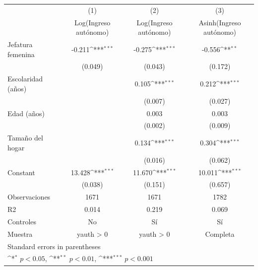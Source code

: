 {
\def\sym#1{\ifmmode^{#1}\else\(^{#1}\)\fi}
\begin{tabular}{l*{3}{c}}
\hline\hline
                    &\multicolumn{1}{c}{(1)}&\multicolumn{1}{c}{(2)}&\multicolumn{1}{c}{(3)}\\
                    &\multicolumn{1}{c}{Log(Ingreso autónomo)}&\multicolumn{1}{c}{Log(Ingreso autónomo)}&\multicolumn{1}{c}{Asinh(Ingreso autónomo)}\\
\hline
Jefatura femenina   &      -0.211\sym{***}&      -0.275\sym{***}&      -0.556\sym{**} \\
                    &     (0.049)         &     (0.043)         &     (0.172)         \\
[1em]
Escolaridad (años)  &                     &       0.105\sym{***}&       0.212\sym{***}\\
                    &                     &     (0.007)         &     (0.027)         \\
[1em]
Edad (años)         &                     &       0.003         &       0.003         \\
                    &                     &     (0.002)         &     (0.009)         \\
[1em]
Tamaño del hogar    &                     &       0.134\sym{***}&       0.304\sym{***}\\
                    &                     &     (0.016)         &     (0.062)         \\
[1em]
Constant            &      13.428\sym{***}&      11.670\sym{***}&      10.011\sym{***}\\
                    &     (0.038)         &     (0.151)         &     (0.657)         \\
\hline
Observaciones       &        1671         &        1671         &        1782         \\
R2                  &       0.014         &       0.219         &       0.069         \\
Controles           &          No         &          Sí         &          Sí         \\
Muestra             &   yauth > 0         &   yauth > 0         &    Completa         \\
\hline\hline
\multicolumn{4}{l}{\footnotesize Standard errors in parentheses}\\
\multicolumn{4}{l}{\footnotesize \sym{*} \(p<0.05\), \sym{**} \(p<0.01\), \sym{***} \(p<0.001\)}\\
\end{tabular}
}
